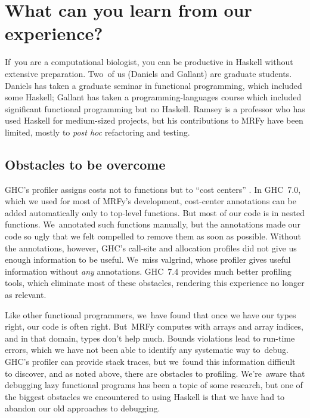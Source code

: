 \documentclass[preprint,nonatbib,blockstyle,times]{sigplanconf}
\let\cite\citep
\begin{document}
\section{What can you learn from our experience?}

If~you are a computational biologist, 
you can be productive in Haskell without extensive preparation.
Two~of us (Daniels and Gallant) are graduate students.
Daniels has taken a graduate seminar in functional programming, which
included some Haskell;
Gallant has taken a programming-languages course which included
significant functional programming but no Haskell.
Ramsey is a professor who has used Haskell 
for medium-sized projects,
but his contributions to MRFy have been limited, mostly to \emph{post hoc}
refactoring and testing.


\subsection{Obstacles to be overcome}

GHC's profiler assigns costs not to functions but to ``cost
centers'' \cite{sansom-pj}.
In GHC~7.0, which we used 
for most of MRFy's development, 
cost-center annotations can be added automatically only
to top-level 
functions.
But most of our code is in nested functions.
We~annotated such functions manually,
but the annotations
made our code so ugly that we felt compelled to
remove them as soon as possible.
Without the annotations, however, GHC's call-site and allocation
profiles did not give us enough information to be useful.
We~miss valgrind, whose profiler gives useful information
without \emph{any} annotations.
GHC~7.4 provides much
better profiling tools, which eliminate most of these obstacles,
rendering this experience no longer as relevant.

Like other functional programmers, we~have found that 
once we have our types right, our code is often right.
But~MRFy computes with arrays and array indices,
and in that domain, types don't help much.
Bounds violations lead to run-time errors, which we have not been able
to identify any systematic way to~debug.
GHC's profiler can provide stack traces, but we~found this information
difficult to discover, and as noted above,
there are obstacles to profiling.
We're~aware that debugging lazy functional programs has been a topic
of some research,
but one of the biggest obstacles we encountered to using Haskell is
that we have had to abandon our old approaches to debugging.
\end{document}
